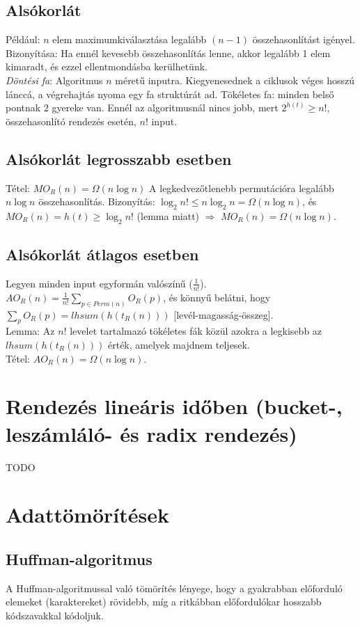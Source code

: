 \documentclass[margin=0px]{article}
\begin{document}
\subsection{Alsókorlát}

Például: $n$ elem maximumkiválasztása legalább $(n-1)$ összehasonlítást igényel. Bizonyítása: Ha ennél kevesebb összehasonlítás lenne, akkor legalább 1 elem kimaradt, és ezzel ellentmondásba kerülhetünk. \\
\textit{Döntési fa}: Algoritmus $n$ méretű inputra. Kiegyenesednek a ciklusok véges hosszú lánccá, a végrehajtás nyoma egy fa struktúrát ad. Tökéletes fa: minden belső pontnak 2 gyereke van. Ennél az algoritmusnál nincs jobb, mert $2^{h(t)} \geq n!$, összehasonlító rendezés esetén, $n!$ input.

\subsection{Alsókorlát legrosszabb esetben}

Tétel: $MO_R(n) = \Omega(n\log{n})$ A legkedvezőtlenebb permutációra legalább $n\log{n}$ összehasonlítás. Bizonyítás: $\log_2{n!} \leq n\log_2{n} = \Omega(n\log{n})$, és $MO_R(n)=h(t) \geq \log_2{n!}$ (lemma miatt) $\Rightarrow$ $MO_R(n)=\Omega(n\log{n})$.

\subsection{Alsókorlát átlagos esetben}

Legyen minden input egyformán valószínű ($\frac{1}{n!}$). \\
$AO_R(n) = \frac{1}{n!}\sum_{p \in Perm(n)}{O_R(p)}$, és könnyű belátni, hogy $\sum_{p}{O_R(p)} = lhsum(h(t_R(n)))$ [levél-magasság-összeg]. \\
Lemma: Az $n!$ levelet tartalmazó tökéletes fák közül azokra a legkisebb az $lhsum(h(t_R(n)))$ érték, amelyek majdnem teljesek. \\
Tétel: $AO_R(n) = \Omega(n\log{n})$.

\section{Rendezés lineáris időben (bucket-, leszámláló- és radix rendezés)}
TODO

\section{Adattömörítések}
\subsection{Huffman-algoritmus}
A Huffman-algoritmussal való tömörítés lényege, hogy a gyakrabban előforduló elemeket (karaktereket) rövidebb, míg a ritkábban előfordulókar hosszabb kódszavakkal kódoljuk.
\end{document}
